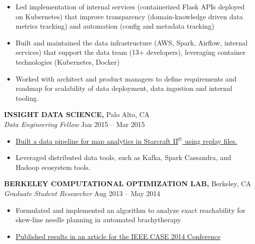 \documentclass[geomargin]{res}
\begin{document}
\begin{resume}
\begin{itemize}
  \item Led implementation of internal services (containerized Flask APIs deployed on Kubernetes) that improve transparency (domain-knowledge driven data metrics tracking) and automation (config and metadata tracking)

  \item Built and maintained the data infrastructure (AWS, Spark, Airflow, internal services) that support the data team (13+ developers), leveraging container technologies (Kubernetes, Docker)

  \item Worked with architect and product managers to define requirements and roadmap for scalability of data deployment, data ingestion and internal tooling.

\end{itemize}
\vspace{-1mm}

{\bf INSIGHT DATA SCIENCE,} Palo Alto, CA \\
{\em Data Engineering Fellow} \hfill
Jan 2015 -- Mar 2015 \\                                          \vspace{-4mm}
\begin{itemize}                                         \itemsep1pt %
  \item \href{https://github.com/guang/stargazer}
    {Built a data pipeline for map analytics in Starcraft II\(^\copyright\)
     using replay files.}
  \item   Leveraged distributed data tools, such as Kafka, Spark Cassandra, and Hadoop ecosystem tools.
\end{itemize}
\vspace{-1mm}

{\bf BERKELEY COMPUTATIONAL OPTIMIZATION LAB,} Berkeley, CA \\
{\em Graduate Student Researcher} \hfill
Aug 2013 -- May 2014 \\                                          \vspace{-4mm}
\begin{itemize}                                         \itemsep1pt %
        \item    Formulated and implemented an algorithm to analyze exact reachability for skew-line needle planning in automated brachytherapy
        \item    \href{http://ieeexplore.ieee.org/abstract/document/6899376/}{Published results in an article for the IEEE CASE 2014 Conference}
\end{itemize}
\vspace{-1mm}



\end{resume}
\end{document}
